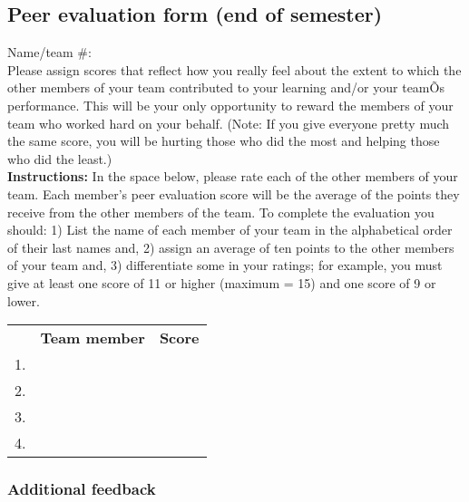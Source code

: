 \documentclass[11pt]{article}
\begin{document}
\newpage
\subsection*{Peer evaluation form (end of semester)}
\pagestyle{empty}

Name/team \#: \\

\noindent Please assign scores that reflect how you really feel about the extent to which the other members of your team contributed to your learning and/or your teamÕs performance. This will be your only opportunity to reward the members of your team who worked hard on your behalf. (Note: If you give everyone pretty much the same score, you will be hurting those who did the most and helping those who did the least.)\\

\noindent \textbf{Instructions:} In the space below, please rate each of the other members of your team. Each member's peer evaluation score will be the average of the points they receive from the other members of the team. To complete the evaluation you should: 1) List the name of each member of your team in the alphabetical order of their last names and, 2) assign an average of ten points to the other members of your team and, 3) differentiate some in your ratings; for example, you must give at least one score of 11 or higher (maximum = 15) and one score of 9 or lower.\\

\begin{center}
\begin{large}
\begin{onehalfspacing}
\begin{tabular}{| p{.5cm} p{5.5cm} p{2.5cm} |}
\hline
&\textbf{Team member} & \textbf{Score} \\

1. & &  \\

2. &  &  \\

3. &  &  \\

4. &  &\\
\hline
\end{tabular}
\end{onehalfspacing}
\end{large}
\end{center}

\subsubsection*{Additional feedback}
\end{document}
